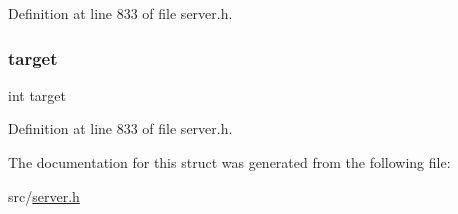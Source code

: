 Definition at line 833 of file server.\+h.

\mbox{\label{structredis_op_ae8aa5cb4faa95420993aad5d4f2e839f}} 
\subsubsection{\texorpdfstring{target}{target}}
{\footnotesize\ttfamily int target}



Definition at line 833 of file server.\+h.



The documentation for this struct was generated from the following file\+:\begin{DoxyCompactItemize}
\item 
src/\hyperlink{server_8h}{server.\+h}\end{DoxyCompactItemize}
